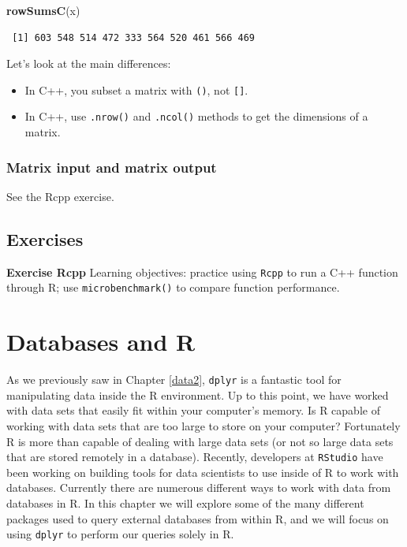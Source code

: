 \documentclass[
]{krantz}
\makeatletter
\newenvironment{Shaded}{\begin{snugshade}}{\end{snugshade}}
\newcommand{\KeywordTok}[1]{\textcolor[rgb]{0.27,0.27,0.27}{\textbf{#1}}}
\newcommand{\NormalTok}[1]{#1}
\providecommand{\tightlist}{%
  \setlength{\itemsep}{0pt}\setlength{\parskip}{0pt}}
\newenvironment{kframe}{%
\medskip{}
\setlength{\fboxsep}{.8em}
 \def\at@end@of@kframe{}%
 \ifinner\ifhmode%
  \def\at@end@of@kframe{\end{minipage}}%
  \begin{minipage}{\columnwidth}%
 \fi\fi%
 \def\FrameCommand##1{\hskip\@totalleftmargin \hskip-\fboxsep
 \colorbox{shadecolor}{##1}\hskip-\fboxsep
     \hskip-\linewidth \hskip-\@totalleftmargin \hskip\columnwidth}%
 \MakeFramed {\advance\hsize-\width
   \@totalleftmargin\z@ \linewidth\hsize
   \@setminipage}}%
 {\par\unskip\endMakeFramed%
 \at@end@of@kframe}
\renewenvironment{Shaded}{\begin{kframe}}{\end{kframe}}
\makeatother
\begin{document}
\begin{Shaded}
\begin{Highlighting}[]
\KeywordTok{rowSumsC}\NormalTok{(x)}
\end{Highlighting}
\end{Shaded}

\begin{verbatim}
 [1] 603 548 514 472 333 564 520 461 566 469
\end{verbatim}

Let's look at the main differences:

\begin{itemize}
\tightlist
\item
  In C++, you subset a matrix with \texttt{()}, not \texttt{{[}{]}}.
\item
  In C++, use \texttt{.nrow()} and \texttt{.ncol()} methods to get the dimensions of a matrix.
\end{itemize}

\hypertarget{matrix-input-and-matrix-output}{%
\subsection{Matrix input and matrix output}\label{matrix-input-and-matrix-output}}

See the Rcpp exercise.

\hypertarget{exercises-9}{%
\section{Exercises}\label{exercises-9}}

\textbf{Exercise Rcpp} Learning objectives: practice using \texttt{Rcpp} to run a C++ function through R; use \texttt{microbenchmark()} to compare function performance.

\hypertarget{databases-and-r}{%
\chapter{Databases and R}\label{databases-and-r}}

As we previously saw in Chapter \ref{data2}, \texttt{dplyr} is a fantastic tool for manipulating data inside the R environment. Up to this point, we have worked with data sets that easily fit within your computer's memory. Is R capable of working with data sets that are too large to store on your computer? Fortunately R is more than capable of dealing with large data sets (or not so large data sets that are stored remotely in a database). Recently, developers at \texttt{RStudio} have been working on building tools for data scientists to use inside of R to work with databases. Currently there are numerous different ways to work with data from databases in R. In this chapter we will explore some of the many different packages used to query external databases from within R, and we will focus on using \texttt{dplyr} to perform our queries solely in R.
\end{document}
